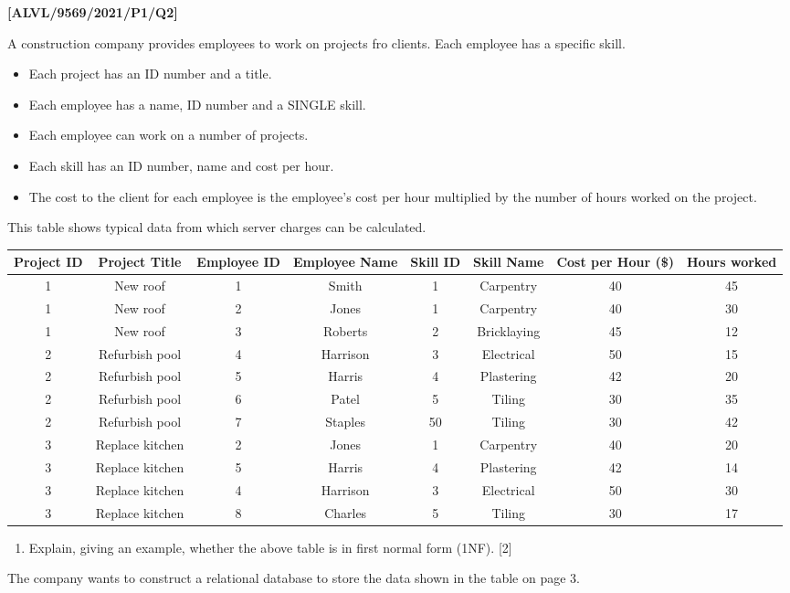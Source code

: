 \item \textbf{{[}ALVL/9569/2021/P1/Q2{]} }

A construction company provides employees to work on projects fro
clients. Each employee has a specific skill.
\begin{itemize}
\item Each project has an ID number and a title.
\item Each employee has a name, ID number and a SINGLE skill.
\item Each employee can work on a number of projects.
\item Each skill has an ID number, name and cost per hour.
\item The cost to the client for each employee is the employee's cost per
hour multiplied by the number of hours worked on the project.
\end{itemize}
This table shows typical data from which server charges can be calculated. 
\noindent \begin{center}
\begin{tabular}{|c|c|c|c|c|c|c|c|}
\hline 
Project ID & Project Title & Employee ID & Employee Name & Skill ID & Skill Name & Cost per Hour (\$) & Hours worked\tabularnewline
\hline 
\hline 
1 & New roof  & 1 & Smith & 1 & Carpentry & 40 & 45\tabularnewline
\hline 
1 & New roof  & 2 & Jones & 1 & Carpentry & 40 & 30\tabularnewline
\hline 
1 & New roof  & 3 & Roberts & 2 & Bricklaying & 45 & 12\tabularnewline
\hline 
2 & Refurbish pool & 4 & Harrison & 3 & Electrical & 50 & 15\tabularnewline
\hline 
2 & Refurbish pool & 5 & Harris & 4 & Plastering & 42 & 20\tabularnewline
\hline 
2 & Refurbish pool & 6 & Patel & 5 & Tiling & 30 & 35\tabularnewline
\hline 
2 & Refurbish pool & 7 & Staples & 50 & Tiling & 30 & 42\tabularnewline
\hline 
3 & Replace kitchen & 2 & Jones & 1 & Carpentry & 40 & 20\tabularnewline
\hline 
3 & Replace kitchen & 5 & Harris & 4 & Plastering & 42 & 14\tabularnewline
\hline 
3 & Replace kitchen & 4 & Harrison & 3 & Electrical & 50 & 30\tabularnewline
\hline 
3 & Replace kitchen & 8 & Charles & 5 & Tiling & 30 & 17\tabularnewline
\hline 
\end{tabular}
\par\end{center}
\begin{enumerate}
\item Explain, giving an example, whether the above table is in first normal
form (1NF). \hfill{}{[}2{]}
\end{enumerate}
The company wants to construct a relational database to store the
data shown in the table on page 3. 

